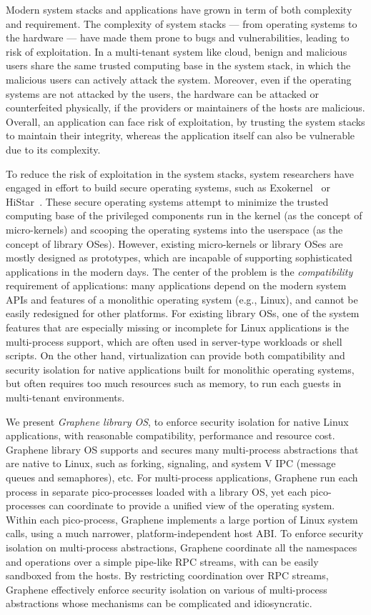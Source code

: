 Modern system stacks and applications have grown in term of both complexity and requirement.
The complexity of system stacks --- from operating systems to the hardware --- have made them prone to bugs and vulnerabilities,
leading to risk of exploitation.
In a multi-tenant system like cloud, benign and malicious users share the same trusted computing base in the system stack,
in which the malicious users can actively attack the system.
Moreover, even if the operating systems are not attacked by the users,
the hardware can be attacked or counterfeited physically, if the providers or maintainers of the hosts are malicious.
Overall, an application can face risk of exploitation,
by trusting the system stacks to maintain their integrity, whereas the application itself can also be vulnerable due to its complexity.

To reduce the risk of exploitation in the system stacks,
system researchers have engaged in effort to build secure operating systems, such as Exokernel~\citep{engler95exokernel} or HiStar~\citep{zeldovich+histar}.
These secure operating systems attempt to minimize the trusted computing base of the privileged components run in the kernel (as the concept of micro-kernels) and scooping the operating systems into the userspace (as the concept of library OSes).
However, existing micro-kernels or library OSes are mostly designed as prototypes, which are incapable of supporting sophisticated applications in the modern days.
The center of the problem is the {\em compatibility} requirement of applications:
many applications depend on the modern system APIs and features of a monolithic operating system (e.g., Linux), and cannot be easily redesigned for other platforms.
For existing library OSs,
one of the system features that are especially missing or incomplete for Linux applications is the multi-process support,
which are often used in server-type workloads or shell scripts.
On the other hand, virtualization can provide both compatibility and security isolation for native applications built for monolithic operating systems, but often requires too much resources such as memory, to run each guests in multi-tenant environments.

We present {\em Graphene library OS}, to enforce security isolation for native Linux applications,
with reasonable compatibility, performance and resource cost.
Graphene library OS supports and secures many multi-process abstractions that are native to Linux, such as forking, signaling, and system V IPC (message queues and semaphores), etc.
For multi-process applications, Graphene run each process in separate pico-processes loaded with a library OS,
yet each pico-processes can coordinate to provide a unified view of the operating system.
Within each pico-process, Graphene implements a large portion of Linux system calls, using a much narrower, platform-independent host ABI.
To enforce security isolation on multi-process abstractions,
Graphene coordinate all the namespaces and operations
over a simple pipe-like RPC streams, with can be easily sandboxed from the hosts.
By restricting coordination over RPC streams,
Graphene effectively enforce security isolation on various of multi-process abstractions whose mechanisms can be complicated and idiosyncratic.

